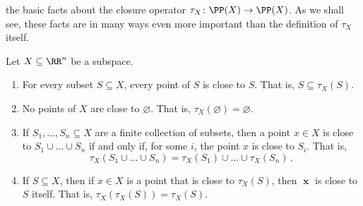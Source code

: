  the basic facts about the closure operator $\tau_X \colon \PP(X) \to \PP(X)$.
As we shall see, these facts are in many ways even more important than the definition of $\tau_X$ itself.
\begin{prp}%
\label{prp:key_properties_of_tau}
	Let $X \subseteq \RR^n $ be a subspace.
	\begin{enumerate}
		\item For every subset $S \subseteq X $, every point of $S$ is close to $S$.
			That is, $S \subseteq \tau_X(S)$.
		\item No points of $X$ are close to $\varnothing$.
			That is, $\tau_X(\varnothing) = \varnothing$.
		\item If $S_1,\dots,S_n \subseteq X$ are a finite collection of subsets, then a point $x \in X$ is close to $ S_1 \cup \dots \cup S_n $ if and only if, for some $i$, the point $x$ is close to $S_i$.
			That is,
			\[
				\tau_X\left(S_1 \cup \dots \cup S_n\right) = \tau_X(S_1) \cup \dots \cup \tau_X(S_n) \period
			\]
		\item If $S \subseteq X$, then if $x \in X$ is a point that is close to $\tau_X(S)$, then $\mbfx$ is close to $S$ itself.
			That is, $\tau_X(\tau_X(S)) = \tau_X(S)$.
	\end{enumerate}
\end{prp}

